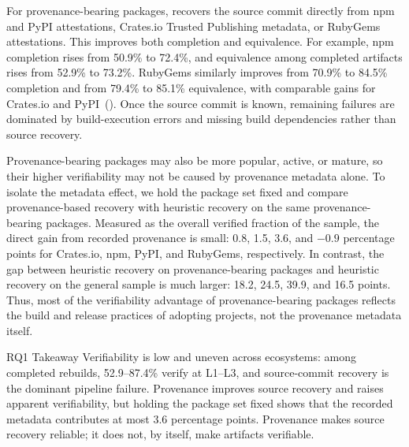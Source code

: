For provenance-bearing packages, \toolname recovers the source commit directly from npm and PyPI attestations, Crates.io Trusted Publishing metadata, or RubyGems attestations. This improves both completion and equivalence. For example, npm completion rises from 50.9\% to 72.4\%, and equivalence among completed artifacts rises from 52.9\% to 73.2\%. RubyGems similarly improves from 70.9\% to 84.5\% completion and from 79.4\% to 85.1\% equivalence, with comparable gains for Crates.io and PyPI~(). Once the source commit is known, remaining failures are dominated by build-execution errors and missing build dependencies rather than source recovery.

Provenance-bearing packages may also be more popular, active, or mature, so their higher verifiability may not be caused by provenance metadata alone. To isolate the metadata effect, we hold the package set fixed and compare provenance-based recovery with heuristic recovery on the same provenance-bearing packages. Measured as the overall verified fraction of the sample, the direct gain from recorded provenance is small: 0.8, 1.5, 3.6, and $-0.9$ percentage points for Crates.io, npm, PyPI, and RubyGems, respectively. In contrast, the gap between heuristic recovery on provenance-bearing packages and heuristic recovery on the general sample is much larger: 18.2, 24.5, 39.9, and 16.5 points. Thus, most of the verifiability advantage of provenance-bearing packages reflects the build and release practices of adopting projects, not the provenance metadata itself.

\begin{rqanswer}{RQ1 Takeaway}
Verifiability is low and uneven across ecosystems: among completed rebuilds, 52.9--87.4\% verify at L1--L3, and source-commit recovery is the dominant pipeline failure. Provenance improves source recovery and raises apparent verifiability, but holding the package set fixed shows that the recorded metadata contributes at most 3.6 percentage points. Provenance makes source recovery reliable; it does not, by itself, make artifacts verifiable.
\end{rqanswer}


